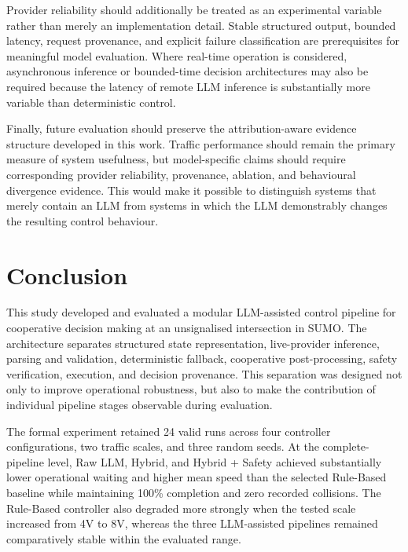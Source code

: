 \documentclass[letterpaper,10pt,conference]{ieeeconf}
\begin{document}
Provider reliability should additionally be treated as an experimental variable rather than merely an implementation detail. Stable structured output, bounded latency, request provenance, and explicit failure classification are prerequisites for meaningful model evaluation. Where real-time operation is considered, asynchronous inference or bounded-time decision architectures may also be required because the latency of remote LLM inference is substantially more variable than deterministic control.



Finally, future evaluation should preserve the attribution-aware evidence structure developed in this work. Traffic performance should remain the primary measure of system usefulness, but model-specific claims should require corresponding provider reliability, provenance, ablation, and behavioural divergence evidence. This would make it possible to distinguish systems that merely contain an LLM from systems in which the LLM demonstrably changes the resulting control behaviour.



\section{Conclusion}



This study developed and evaluated a modular LLM-assisted control pipeline for cooperative decision making at an unsignalised intersection in SUMO. The architecture separates structured state representation, live-provider inference, parsing and validation, deterministic fallback, cooperative post-processing, safety verification, execution, and decision provenance. This separation was designed not only to improve operational robustness, but also to make the contribution of individual pipeline stages observable during evaluation.



The formal experiment retained 24 valid runs across four controller configurations, two traffic scales, and three random seeds. At the complete-pipeline level, Raw LLM, Hybrid, and Hybrid + Safety achieved substantially lower operational waiting and higher mean speed than the selected Rule-Based baseline while maintaining 100\% completion and zero recorded collisions. The Rule-Based controller also degraded more strongly when the tested scale increased from 4V to 8V, whereas the three LLM-assisted pipelines remained comparatively stable within the evaluated range.
\end{document}

